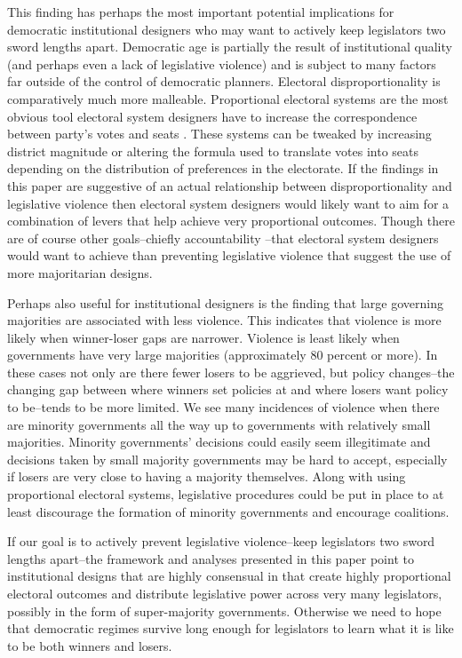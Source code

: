 \documentclass[a4paper]{article}\usepackage{graphicx, color}
\begin{document}
This finding has perhaps the most important potential implications for democratic institutional designers who may want to actively keep legislators two sword lengths apart. Democratic age is partially the result of institutional quality (and perhaps even a lack of legislative violence) and is subject to many factors far outside of the control of democratic planners. Electoral disproportionality is comparatively much more malleable. Proportional electoral systems are the most obvious tool electoral system designers have to increase the correspondence between party's votes and seats \citep{Carey2011}. These systems can be tweaked by increasing district magnitude or altering the formula used to translate votes into seats depending on the distribution of preferences in the electorate. If the findings in this paper are suggestive of an actual relationship between disproportionality and legislative violence then electoral system designers would likely want to aim for a combination of levers that help achieve very proportional outcomes. Though there are of course other goals--chiefly accountability \citep{Lijphart1984, Powell2000}--that electoral system designers would want to achieve than preventing legislative violence that suggest the use of more majoritarian designs. 

Perhaps also useful for institutional designers is the finding that large governing majorities are associated with less violence. This indicates that violence is more likely when winner-loser gaps are narrower. Violence is least likely when governments have very large majorities (approximately 80 percent or more). In these cases not only are there fewer losers to be aggrieved, but policy changes--the changing gap between where winners set policies at and where losers want policy to be--tends to be more limited. We see many incidences of violence when there are minority governments all the way up to governments with relatively small majorities. Minority governments' decisions could easily seem illegitimate and decisions taken by small majority governments may be hard to accept, especially if losers are very close to having a majority themselves. Along with using proportional electoral systems, legislative procedures could be put in place to at least discourage the formation of minority governments and encourage coalitions. %

If our goal is to actively prevent legislative violence--keep legislators two sword lengths apart--the framework and analyses presented in this paper point to institutional designs that are highly consensual in that create highly proportional electoral outcomes and distribute legislative power across very many legislators, possibly in the form of super-majority governments. Otherwise we need to hope that democratic regimes survive long enough for legislators to learn what it is like to be both winners and losers.
\end{document}
